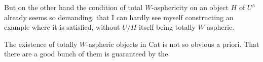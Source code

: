 \documentclass[11pt]{article}
\newcommand{\msp}[1]{\marginpar{\footnotesize [#1]}}
\begin{document}
But on the other hand the condition of total $W$-asphericity on an object $H$ of $U^{\wedge}$ already seems so demanding, that I can hardly see myself con\msp{page 97}structing an example where it is satisfied, without $U/H$ itself being totally $W$-aspheric.

The existence of totally $W$-aspheric objects in Cat is not so obvious a priori. That there are a good bunch of them is guaranteed by the
\end{document}
